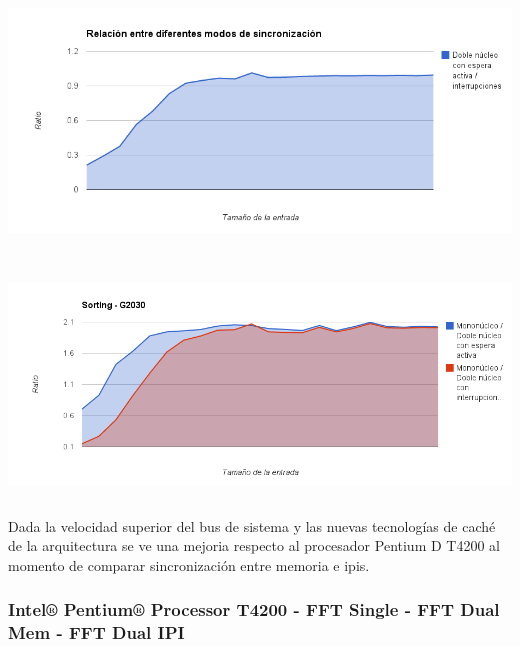 \begin{center}
	    \includegraphics[height=7cm]{images/memory_ipis_g2030_sortipi.png}
	\end{center}


\begin{center}
	    \includegraphics[height=6cm]{images/sort_ipis_g2030.png}
	\end{center}


Dada la velocidad superior del bus de sistema y las nuevas tecnologías de caché de la arquitectura se ve una mejoria respecto al procesador Pentium D T4200 al momento de comparar sincronización entre memoria e ipis. 

\subsubsection{Intel® Pentium® Processor T4200 - FFT Single - FFT Dual Mem - FFT Dual IPI}

